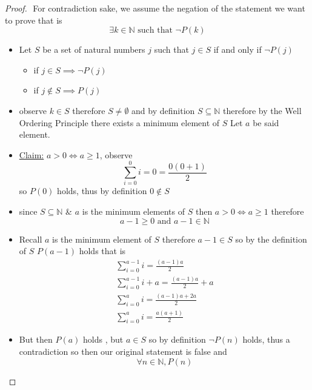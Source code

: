 \documentclass[11pt]{book}
\begin{document}
\begin{proof}
$ $\newline
    For contradiction sake, we assume the negation of the statement we want to prove that is
    \[
    \exists k \in \mathbb{N} \text{ such that } \neg P\left(k\right) 
    \]
    \begin{itemize}
        \item Let $S$ be a set of natural numbers $j$ such that $j\in S$ if and only if $\neg P\left(j\right) $ 
            \begin{itemize}
                \item if $j\in S \implies \neg P\left(j\right) $ 
                \item if $j \not\in S \implies P\left(j\right) $ 
            \end{itemize}
        \item observe $k \in S$ therefore $S \neq \emptyset $ and by definition $S \subseteq \mathbb{N} $ therefore by the Well Ordering Principle there exists a minimum element of $S$ Let $a$ be said element.  
        \item \underline{Claim:} $a > 0 \Leftrightarrow a \ge 1$,  observe
            \[
                \sum_{i=0}^{0} i = 0 = \frac{0\left( 0 + 1 \right) }{2}
            \]
            so $P\left(0\right) $ holds, thus by definition $0 \not\in S$
            \item since $S\subseteq \mathbb{N} $ \& $a$ is the minimum elements of $S$ then $a > 0 \Leftrightarrow a \ge 1$ therefore 
                \[
                a - 1 \ge 0 \text{ and } a - 1 \in \mathbb{N} 
                \]
            \item Recall $a$ is the minimum element of $S$ therefore $a - 1 \in S$ so by the definition of $S$ $P\left(a - 1\right) $ holds that is 
            \begin{gather*}
                \sum_{i=0}^{a - 1} i = \frac{\left( a - 1 \right) a}{2}\\
                \sum_{i=0}^{a - 1} i  + a =  \frac{\left( a - 1 \right) a}{2}  + a\\
                \sum_{i=0}^{a} i = \frac{\left( a - 1 \right) a  + 2a}{2}\\
                \sum_{i=0}^{a} i = \frac{a\left( a + 1 \right) }{2}  
            \end{gather*}
        \item But then $P\left(a\right) $ holds , but $a \in S$ so by definition $\neg P\left(n\right) $ holds, thus a contradiction so then our original statement is false and 
            \[
            \forall n \in \mathbb{N} , P\left(n\right) 
            \]
    \end{itemize}
    
\end{proof}
\end{document}
